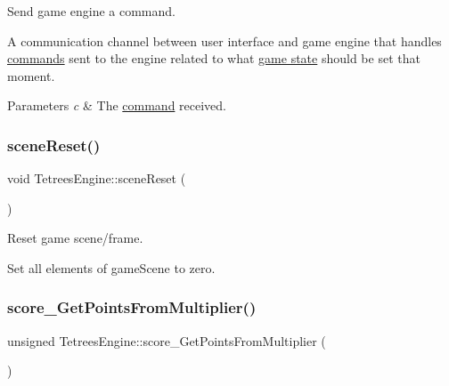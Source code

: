 Send game engine a command. 

A communication channel between user interface and game engine that handles \hyperlink{TetreesDefs_8hpp_aadc337e2620d6621659e63e87c45e79d}{commands} sent to the engine related to what \hyperlink{TetreesDefs_8hpp_aebae08b2e3a36f1452b33acaf1eaab40}{game state} should be set that moment. 
\begin{DoxyParams}{Parameters}
{\em c} & The \hyperlink{TetreesDefs_8hpp_aadc337e2620d6621659e63e87c45e79d}{command} received. \\
\hline
\end{DoxyParams}
\mbox{\label{classTetreesEngine_acb719449a68465839ebb0a5e7724cc34}} 
\subsubsection{\texorpdfstring{scene\+Reset()}{sceneReset()}}
{\footnotesize\ttfamily void Tetrees\+Engine\+::scene\+Reset (\begin{DoxyParamCaption}{ }\end{DoxyParamCaption})\hspace{0.3cm}{\ttfamily [private]}}



Reset game scene/frame. 

Set all elements of game\+Scene to zero. \mbox{\label{classTetreesEngine_a848fc0ff4003f3c4d74c11efdc91f0cb}} 
\subsubsection{\texorpdfstring{score\+\_\+\+Get\+Points\+From\+Multiplier()}{score\_GetPointsFromMultiplier()}}
{\footnotesize\ttfamily unsigned Tetrees\+Engine\+::score\+\_\+\+Get\+Points\+From\+Multiplier (\begin{DoxyParamCaption}{ }\end{DoxyParamCaption})\hspace{0.3cm}{\ttfamily [private]}}



